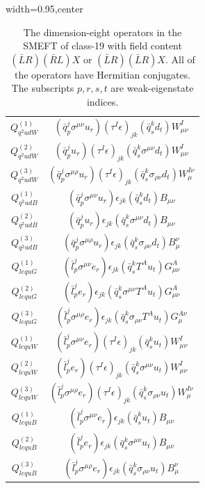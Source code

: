 \begin{table}[H]
\begin{center}
\begin{adjustbox}{width=0.95\textwidth,center}
\begin{minipage}[t]{7.6cm}
\begin{tabular}[t]{c|c}
%
$Q_{q^2udW}^{(1)}$  &  $(\bar q_p^j \sigma^{\mu\nu} u_r) (\tau^I \epsilon)_{jk} (\bar q_s^k d_t) W^I_{\mu\nu}$ \\
%
$Q_{q^2udW}^{(2)}$  &  $(\bar q_p^j u_r) (\tau^I \epsilon)_{jk} (\bar q_s^k \sigma^{\mu\nu} d_t) W^I_{\mu\nu}$ \\
%
$Q_{q^2udW}^{(3)}$  &  $(\bar q_p^j \sigma^{\mu\rho} u_r) (\tau^I \epsilon)_{jk} (\bar q_s^k \sigma_{\rho\nu} d_t) W^{I\nu}_\mu$ \\
%
$Q_{q^2udB}^{(1)}$  &  $(\bar q_p^j \sigma^{\mu\nu} u_r) \epsilon_{jk} (\bar q_s^k d_t) B_{\mu\nu}$ \\
%
$Q_{q^2udB}^{(2)}$  &  $(\bar q_p^j u_r) \epsilon_{jk} (\bar q_s^k \sigma^{\mu\nu} d_t) B_{\mu\nu}$ \\
%
$Q_{q^2udB}^{(3)}$  &  $(\bar q_p^j \sigma^{\mu\rho} u_r) \epsilon_{jk} (\bar q_s^k \sigma_{\rho\nu} d_t) B_\mu^\nu$ \\
%
$Q_{lequG}^{(1)}$  &  $(\bar l_p^j \sigma^{\mu\nu} e_r) \epsilon_{jk} (\bar q_s^k T^A u_t) G^A_{\mu\nu}$ \\
%
$Q_{lequG}^{(2)}$  &  $(\bar l_p^j e_r) \epsilon_{jk} (\bar q_s^k \sigma^{\mu\nu} T^A u_t) G^A_{\mu\nu}$ \\
%
$Q_{lequG}^{(3)}$  &  $(\bar l_p^j \sigma^{\mu\rho} e_r) \epsilon_{jk} (\bar q_s^k \sigma_{\rho\nu} T^A u_t) G_\mu^{A\nu}$ \\
%
$Q_{lequW}^{(1)}$  &  $(\bar l_p^j \sigma^{\mu\nu} e_r) (\tau^I \epsilon)_{jk} (\bar q_s^k u_t) W^I_{\mu\nu}$ \\
%
$Q_{lequW}^{(2)}$  &  $(\bar l_p^j e_r) (\tau^I \epsilon)_{jk} (\bar q_s^k \sigma^{\mu\nu} u_t) W^I_{\mu\nu}$ \\
%
$Q_{lequW}^{(3)}$  &  $(\bar l_p^j \sigma^{\mu\rho} e_r) (\tau^I \epsilon)_{jk} (\bar q_s^k \sigma_{\rho\nu} u_t) W^{I\nu}_\mu$ \\
%
$Q_{lequB}^{(1)}$  &  $(\bar l_p^j \sigma^{\mu\nu} e_r) \epsilon_{jk} (\bar q_s^k u_t) B_{\mu\nu}$ \\
%
$Q_{lequB}^{(2)}$  &  $(\bar l_p^j e_r) \epsilon_{jk} (\bar q_s^k \sigma^{\mu\nu} u_t) B_{\mu\nu}$ \\
%
$Q_{lequB}^{(3)}$  &  $(\bar l_p^j \sigma^{\mu\rho} e_r) \epsilon_{jk} (\bar q_s^k \sigma_{\rho\nu} u_t) B_\mu^\nu$
\end{tabular}
\end{minipage}
\end{adjustbox}
\end{center}
\caption{The dimension-eight operators in the SMEFT of class-19 with field content $(\bar L R) (\bar R L) X$ or $(\bar L R) (\bar L R) X$. 
All of the operators have Hermitian conjugates. 
The subscripts $p, r, s, t$ are weak-eigenstate indices. }
\label{tab:smeft8class_19_LRRL_LRLR}
\end{table}

